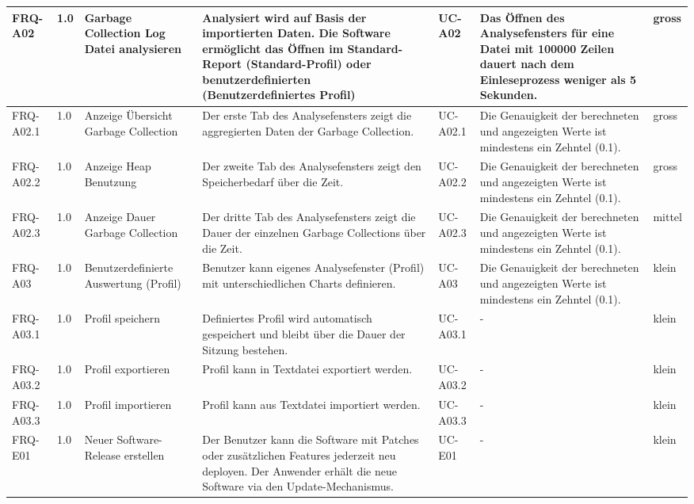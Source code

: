 \begin{landscape}
\begin{longtable}{|p{1.8cm}|p{0.7cm}|p{2.5cm}|p{5cm}|p{1.6cm}|p{4cm}|p{0.9cm}|}
  FRQ-A02 & 1.0 & Garbage Collection Log Datei analysieren & Analysiert wird auf Basis der importierten Daten. Die Software ermöglicht das Öffnen im Standard-Report (Standard-Profil) oder benutzerdefinierten (Benutzerdefiniertes Profil)& UC-A02 & Das Öffnen des Analysefensters für eine Datei mit 100000 Zeilen dauert nach dem Einleseprozess weniger als 5 Sekunden. & gross  \\\hline

   FRQ-A02.1 & 1.0 & Anzeige Übersicht Garbage Collection & Der erste Tab des Analysefensters zeigt die aggregierten Daten der Garbage Collection. & UC-A02.1 & Die Genauigkeit der berechneten und angezeigten Werte ist mindestens ein Zehntel (0.1). & gross \\\hline

   FRQ-A02.2 & 1.0 & Anzeige Heap Benutzung & Der zweite Tab des Analysefensters zeigt den Speicherbedarf über die Zeit. & UC-A02.2 & Die Genauigkeit der berechneten und angezeigten Werte ist mindestens ein Zehntel (0.1). & gross 
 \\\hline

   FRQ-A02.3 & 1.0 & Anzeige Dauer Garbage Collection & Der dritte Tab des Analysefensters zeigt die Dauer der einzelnen Garbage Collections über die Zeit. & UC-A02.3 & Die Genauigkeit der berechneten und angezeigten Werte ist mindestens ein Zehntel (0.1). & mittel 
 \\\hline

   FRQ-A03 & 1.0 & Benutzerdefinierte Auswertung (Profil) & Benutzer kann eigenes Analysefenster (Profil) mit unterschiedlichen Charts definieren. & UC-A03 & Die Genauigkeit der berechneten und angezeigten Werte ist mindestens ein Zehntel (0.1). & klein \\\hline

   FRQ-A03.1 & 1.0 & Profil speichern & Definiertes Profil wird automatisch gespeichert und bleibt über die Dauer der Sitzung bestehen. & UC-A03.1 & - & klein \\\hline

  FRQ-A03.2 & 1.0 & Profil exportieren & Profil kann in Textdatei exportiert werden. & UC-A03.2 & - & klein \\\hline

  FRQ-A03.3 & 1.0 & Profil importieren & Profil kann aus Textdatei importiert werden. & UC-A03.3 & - & klein \\\hline

  FRQ-E01 & 1.0 & Neuer Software-Release erstellen & Der Benutzer kann die Software mit Patches oder zusätzlichen Features jederzeit neu deployen. Der Anwender erhält die neue Software via den Update-Mechanismus.& UC-E01 & - & klein \\\hline

\end{longtable}
\end{landscape}

